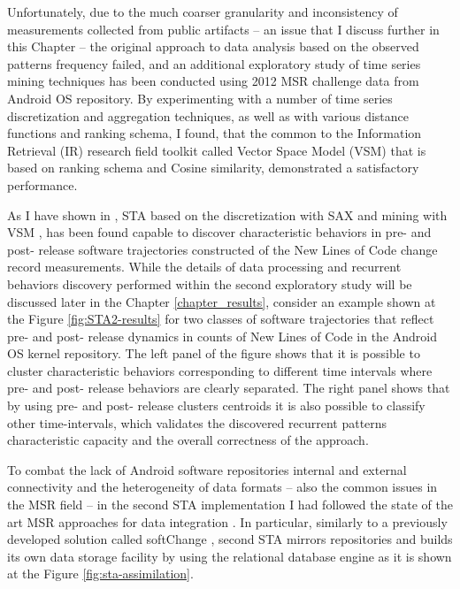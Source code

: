 Unfortunately, due to the much coarser granularity and inconsistency of measurements collected from public artifacts -- 
an issue that I discuss further in this Chapter -- the original approach to data analysis based on the observed patterns 
frequency failed, and an additional exploratory study of time series mining techniques has been conducted using 
2012 MSR challenge data \cite{MSRChallenge2012} from Android OS repository.
By experimenting with a number of time series discretization and aggregation techniques, as well as with various distance 
functions and ranking schema, I found, that the common to the Information Retrieval (IR) research field toolkit called 
Vector Space Model (VSM) \cite{citeulike:300428} that is based on \tfidf ranking schema and Cosine similarity, 
demonstrated a satisfactory performance. 

As I have shown in \cite{csdl2-11-10}, STA based on the discretization with SAX \cite{sax} and mining with VSM 
\cite{citeulike:300428}, has been found capable to discover characteristic behaviors in pre- and post- release software 
trajectories constructed of the New Lines of Code change record measurements.
While the details of data processing and recurrent behaviors discovery performed within the second exploratory study will be 
discussed later in the Chapter \ref{chapter_results}, consider an example shown at the Figure \ref{fig:STA2-results} 
for two classes of software trajectories that reflect pre- and post- release dynamics in counts of New Lines of Code in 
the Android OS kernel repository. 
The left panel of the figure shows that it is possible to cluster characteristic behaviors corresponding to different time intervals 
where pre- and post- release behaviors are clearly separated. 
The right panel shows that by using pre- and post- release clusters centroids it is also possible to classify other time-intervals, 
which validates the discovered recurrent patterns characteristic capacity and the overall correctness of the approach.

To combat the lack of Android software repositories internal and external connectivity and the heterogeneity 
of data formats -- also the common issues in the MSR field -- in the second STA implementation I had followed the state of 
the art MSR approaches for data integration \cite{citeulike:13058334} \cite{cvsanaly}. 
In particular, similarly to a previously developed solution called softChange \cite{german04_softchange}, second STA mirrors 
repositories and builds its own data storage facility by using the relational database engine as it is shown at 
the Figure \ref{fig:sta-assimilation}.

